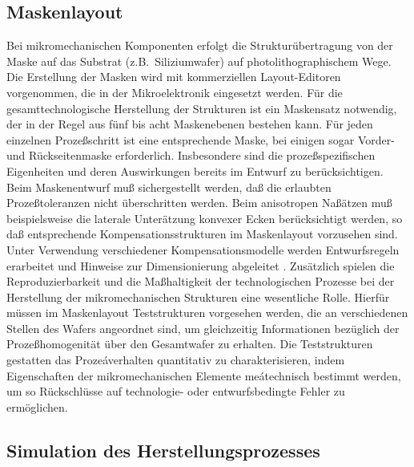 \clearpage

\subsection{Maskenlayout}
\label{maskenlayout}

Bei mikromechanischen Komponenten erfolgt die Strukturübertragung von
der Maske auf das Substrat (z.B.\ Siliziumwafer)
auf photolithographischem Wege. Die
Erstellung der Masken wird mit kommerziellen Layout-Editoren
vorgenommen, die in der Mikroelektronik eingesetzt werden.  Für die
gesamttechnologische Herstellung der Strukturen ist ein Maskensatz
notwendig, der in der Regel aus fünf bis acht Maskenebenen bestehen
kann. Für jeden einzelnen Prozeßschritt ist eine entsprechende Maske,
bei einigen sogar Vorder- und Rückseitenmaske erforderlich.
Insbesondere sind die prozeßspezifischen Eigenheiten und deren
Auswirkungen bereits im Entwurf zu berücksichtigen. Beim Maskenentwurf muß
sichergestellt werden, daß die erlaubten Prozeßtoleranzen nicht
überschritten werden. Beim anisotropen Naßätzen muß beispielsweise die
laterale Unterätzung konvexer Ecken berücksichtigt werden, so daß
entsprechende Kompensationsstrukturen im Maskenlayout vorzusehen sind.
Unter Verwendung verschiedener Kompensationsmodelle werden
Entwurfsregeln erarbeitet und Hinweise zur Dimensionierung abgeleitet
\cite{Haf92}. Zusätzlich spielen die Reproduzierbarkeit und die
Maßhaltigkeit der technologischen Prozesse bei der Herstellung der
mikromechanischen Strukturen eine wesentliche Rolle. Hierfür müssen im
Maskenlayout Teststrukturen vorgesehen werden, die an verschiedenen
Stellen des Wafers angeordnet sind, um gleichzeitig Informationen
bezüglich der Prozeßhomogenität über den Gesamtwafer zu erhalten. Die
Teststrukturen gestatten das Prozeáverhalten quantitativ zu
charakterisieren, indem Eigenschaften der mikromechanischen Elemente
meátechnisch bestimmt werden, um so Rückschlüsse auf technologie- oder
entwurfsbedingte Fehler zu ermöglichen.


\subsection{Simulation des Herstellungsprozesses}
\label{processmodeling}

